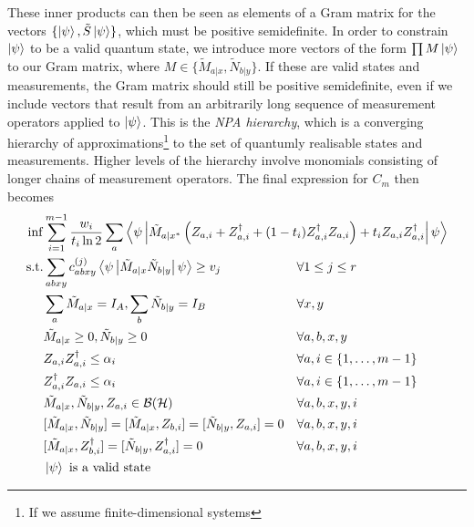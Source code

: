 \documentclass[10pt, a4paper]{article}
\numberwithin{equation}{section} %
\theoremstyle{definition}
\theoremstyle{plain}
\newcommand{\dintv}[2]{\mathopen\{#1,\ldots,#2\mathclose\}}
\newcommand{\?}{\mathrel{?}} %
\newcommand{\angleb}[1]{\left\langle #1 \right\rangle} %
\newcommand{\Hs}{\mathcal{H}} %
\newcommand{\sB}{\mathcal{B}}
\begin{document}
      These inner products can then be seen as elements of a Gram matrix for the vectors \(\{\ket{\psi}, \tilde{S}\ket{\psi}\}\), which must be positive semidefinite. In order to constrain \(\ket{\psi}\) to be a valid quantum state, we introduce more vectors of the form \(\prod M\ket{\psi}\) to our Gram matrix, where \(M \in \{\tilde{M}_{a|x}, \tilde{N}_{b|y}\}\). If these are valid states and measurements, the Gram matrix should still be positive semidefinite, even if we include vectors that result from an arbitrarily long sequence of measurement operators applied to \(\ket{\psi}\). This is the \emph{NPA hierarchy}, which is a converging hierarchy of approximations\footnote{If we assume finite-dimensional systems} to the set of quantumly realisable states and measurements. Higher levels of the hierarchy involve monomials consisting of longer chains of measurement operators. The final expression for \(C_m\) then becomes
      \begin{align}
        \inf & \sum_{i=1}^{m-1} \frac{w_i}{t_i \ln 2} \sum_a \angleb{\psi\left|
         \tilde{M}_{a|x^*} \left( Z_{a,i} + Z_{a,i}^{\dagger} + (1-t_i)  Z_{a,i}^{\dagger}Z_{a,i}\right) + t_i Z_{a,i}Z_{a,i}^{\dagger} \right|\psi} \\
        \text{s.t.} & \begin{aligned}[t] 
          & \sum_{abxy} c^{(j)}_{abxy} \angleb{\psi\left| \tilde{M}_{a|x} \tilde{N}_{b|y} \right|\psi} \geq v_j & & \forall 1 \leq j \leq r \\
          & \sum_{a} \tilde{M}_{a|x} = I_{A}, \sum_{b} \tilde{N}_{b|y} = I_{B} & & \forall x, y \\
          & \tilde{M}_{a|x} \geq 0, \tilde{N}_{b|y} \geq 0 & & \forall a, b, x, y \\
          & Z_{a,i} Z_{a,i}^{\dagger} \leq \alpha_i & & \forall a, i \in \dintv{1}{m-1} \\
          & Z_{a,i}^{\dagger} Z_{a,i} \leq \alpha_i & & \forall a, i \in \dintv{1}{m-1} \\
          & \tilde{M}_{a|x}, \tilde{N}_{b|y}, Z_{a,i} \in \sB(\Hs) & & \forall a, b, x, y, i \\
          & [\tilde{M}_{a|x}, \tilde{N}_{b|y}] = [\tilde{M}_{a|x}, Z_{b,i}] = [\tilde{N}_{b|y}, Z_{a,i}] = 0 & & \forall a, b, x, y, i \\
          & [\tilde{M}_{a|x}, Z_{b,i}^{\dagger}] = [\tilde{N}_{b|y}, Z_{a,i}^{\dagger}] = 0 & & \forall a, b, x, y, i \\
          & \ket{\psi} \text{ is a valid state} & & \\
        \end{aligned}
        \end{align}
\end{document}
